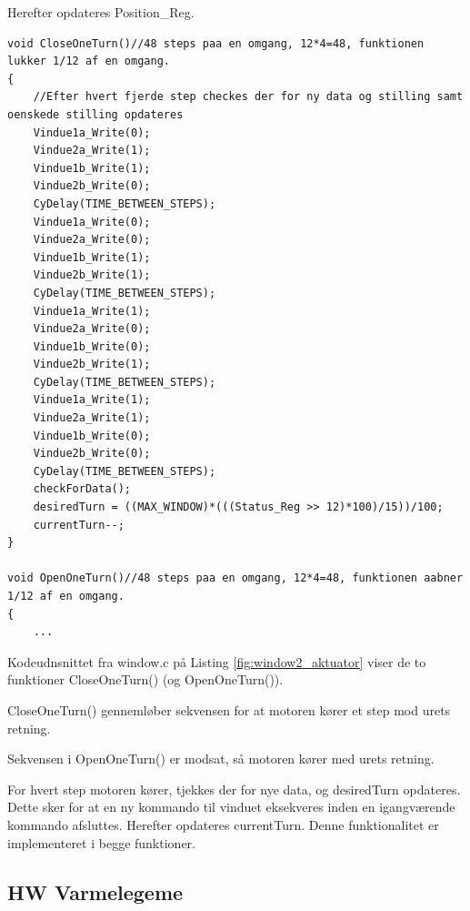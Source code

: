 Herefter opdateres Position\_Reg.

\clearpage

\begin{lstlisting}[caption=Udsnit B af window.c for PSoC4 i Aktuator, label=fig:window2_aktuator]
void CloseOneTurn()//48 steps paa en omgang, 12*4=48, funktionen lukker 1/12 af en omgang.
{
    //Efter hvert fjerde step checkes der for ny data og stilling samt oenskede stilling opdateres
    Vindue1a_Write(0);
    Vindue2a_Write(1);
    Vindue1b_Write(1);
    Vindue2b_Write(0);
    CyDelay(TIME_BETWEEN_STEPS);
    Vindue1a_Write(0);
    Vindue2a_Write(0);
    Vindue1b_Write(1);
    Vindue2b_Write(1);
    CyDelay(TIME_BETWEEN_STEPS);
    Vindue1a_Write(1);
    Vindue2a_Write(0);
    Vindue1b_Write(0);
    Vindue2b_Write(1);
    CyDelay(TIME_BETWEEN_STEPS);
    Vindue1a_Write(1);
    Vindue2a_Write(1);
    Vindue1b_Write(0);
    Vindue2b_Write(0);
    CyDelay(TIME_BETWEEN_STEPS);
    checkForData();
    desiredTurn = ((MAX_WINDOW)*(((Status_Reg >> 12)*100)/15))/100;
    currentTurn--;
}

void OpenOneTurn()//48 steps paa en omgang, 12*4=48, funktionen aabner 1/12 af en omgang.
{
    ...
\end{lstlisting}

Kodeudnsnittet fra window.c på Listing \ref{fig:window2_aktuator} viser de to funktioner CloseOneTurn() (og OpenOneTurn()). 

CloseOneTurn() gennemløber sekvensen for at motoren kører et step mod urets retning.

Sekvensen i OpenOneTurn() er modsat, så motoren kører med urets retning. 

For hvert step motoren kører, tjekkes der for nye data, og desiredTurn opdateres. Dette sker for at en ny kommando til vinduet eksekveres inden en igangværende kommando afsluttes. Herefter opdateres currentTurn. Denne funktionalitet er implementeret i begge funktioner.

\clearpage

\subsection{HW Varmelegeme}

